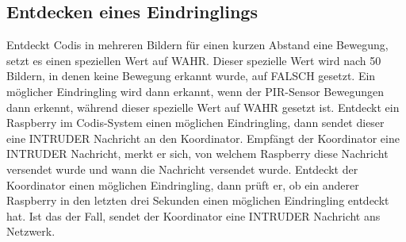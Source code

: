 \documentclass[journal]{IEEEtran}
\begin{document}
\subsection{Entdecken eines Eindringlings}

Entdeckt Codis in mehreren Bildern für einen kurzen Abstand eine Bewegung, setzt es einen speziellen Wert auf WAHR. Dieser spezielle Wert wird nach 50 Bildern, in denen keine Bewegung erkannt wurde, auf FALSCH gesetzt. Ein möglicher Eindringling wird dann erkannt, wenn der PIR-Sensor Bewegungen dann erkennt, während dieser spezielle Wert auf WAHR gesetzt ist. Entdeckt ein Raspberry im Codis-System einen möglichen Eindringling, dann sendet dieser eine \MakeUppercase{intruder} Nachricht an den Koordinator. Empfängt der Koordinator eine \MakeUppercase{intruder} Nachricht, merkt er sich, von welchem Raspberry diese Nachricht versendet wurde und wann die Nachricht versendet wurde. Entdeckt der Koordinator einen möglichen Eindringling, dann prüft er, ob ein anderer Raspberry in den letzten drei Sekunden einen möglichen Eindringling entdeckt hat. Ist das der Fall, sendet der Koordinator eine \MakeUppercase{intruder} Nachricht ans Netzwerk.
\end{document}
